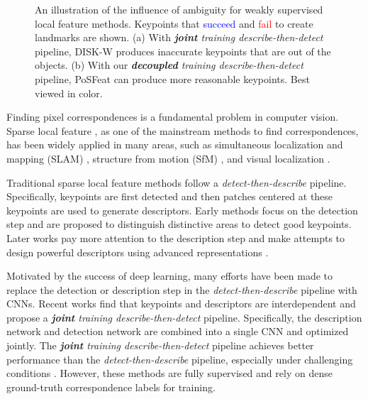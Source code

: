 \documentclass[10pt,twocolumn,letterpaper]{article}
\begin{document}
\begin{figure}[t]
    \centering
    \quad
    \caption{An illustration of the influence of ambiguity for weakly supervised local feature methods. Keypoints that \textcolor{blue}{succeed} and \textcolor{red}{fail} to create landmarks are shown. (a) With \textit{\textbf{joint} training describe-then-detect} pipeline, DISK-W \cite{tyszkiewiczDISKLearningLocal2020a}  produces inaccurate keypoints that are out of the  objects. (b) With our \textit{\textbf{decoupled} training describe-then-detect} pipeline, PoSFeat can produce more reasonable keypoints. Best viewed in color.}
    \label{fig_ambiguity}
\end{figure}

Finding pixel correspondences is a fundamental problem in computer vision. {Sparse local feature \cite{lowe2004distinctive,bay2006surf,rublee2011orb,detone2018superpoint, wang2017persistence}, as one of the mainstream methods to find correspondences, has been widely applied in many areas,} such as simultaneous localization and mapping (SLAM) \cite{mur2017orb,zhao2019gslam}, structure from motion (SfM) \cite{schonberger2016structure,agarwal2011building}, and visual localization \cite{sattler2012improving, cai2019ground, zhang2021reference, guo2022soft}.


Traditional sparse local feature methods \cite{lowe2004distinctive, bay2006surf, rublee2011orb} follow a \textit{detect-then-describe}
pipeline. Specifically, keypoints are first detected and then patches centered at these keypoints are used to generate descriptors. 
{Early methods \cite{gunn1998edge, harris1988combined, lowe2004distinctive, leutenegger2011brisk} focus on the detection step and are proposed to distinguish distinctive areas to detect good keypoints. Later works pay more attention to the description step and make attempts to design powerful descriptors using advanced representations \cite{bay2006surf,calonder2011brief,rublee2011orb}.}

Motivated by the success of deep learning, many efforts \cite{yi2016lift,NIPS2017_831caa1b,ono2018lf,luo2019contextdesc,tian2019sosnet} have been made to replace the detection or description step in the \textit{detect-then-describe}
pipeline with CNNs. Recent works \cite{Dusmanu2019CVPR,revaud2019r2d2,luo2020aslfeat,tyszkiewiczDISKLearningLocal2020a} find that keypoints and descriptors are interdependent and propose a \textit{\textbf{joint} training describe-then-detect} pipeline. Specifically, the description network and detection network are combined into a single CNN and optimized jointly. The \textit{\textbf{joint} training describe-then-detect} pipeline achieves better performance than the \textit{detect-then-describe} pipeline, especially under challenging conditions \cite{toft2020long, jin2021image}. However, these methods are fully supervised and rely on dense ground-truth correspondence labels for training.
\end{document}
